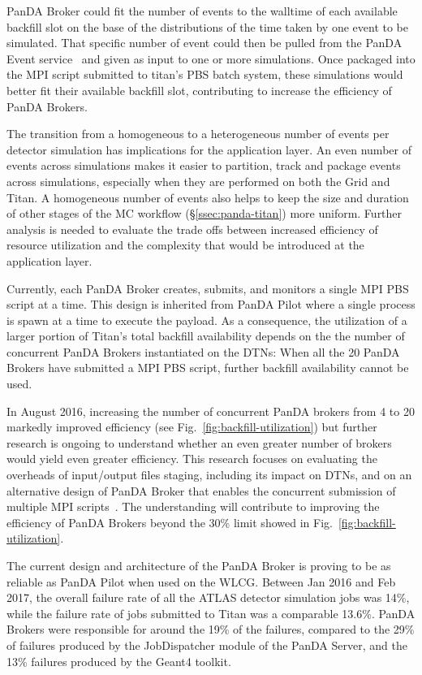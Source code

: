 PanDA Broker could fit the number of events to the walltime of each available
backfill slot on the base of the distributions of the time taken by one event
to be simulated. That specific number of event could then be pulled from the
PanDA Event service~\cite{calafiura2015atlas} and given as input to one or
more simulations. Once packaged into the MPI script submitted to titan's PBS
batch system, these simulations would better fit their available backfill
slot, contributing to increase the efficiency of PanDA Brokers.

The transition from a homogeneous to a heterogeneous number of events per
detector simulation has implications for the application layer. An even
number of events across simulations makes it easier to partition, track and
package events across simulations, especially when they are performed on both
the Grid and Titan. A homogeneous number of events also helps to keep the
size and duration of other stages of the MC workflow
(\S\ref{ssec:panda-titan}) more uniform. Further analysis is needed to
evaluate the trade offs between increased efficiency of resource utilization
and the complexity that would be introduced at the application layer.

Currently, each PanDA Broker creates, submits, and monitors a single MPI PBS
script at a time. This design is inherited from PanDA Pilot where a single
process is spawn at a time to execute the payload. As a consequence, the
utilization of a larger portion of Titan's total backfill availability
depends on the the number of concurrent PanDA Brokers instantiated on the
DTNs: When all the 20 PanDA Brokers have submitted a MPI PBS script, further
backfill availability cannot be used.

In August 2016, increasing the number of concurrent PanDA brokers from 4 to
20 markedly improved efficiency (see Fig.~\ref{fig:backfill-utilization}) but
further research is ongoing to understand whether an even greater number of
brokers would yield even greater efficiency. This research focuses on
evaluating the overheads of input/output files staging, including its impact
on DTNs, and on an alternative design of PanDA Broker that enables the
concurrent submission of multiple MPI scripts~\cite{barreiro2016panda}. The
understanding will contribute to improving the efficiency of PanDA Brokers
beyond the 30\% limit showed in Fig.~\ref{fig:backfill-utilization}.

The current design and architecture of the PanDA Broker is proving to be as
reliable as PanDA Pilot when used on the WLCG\@. Between Jan 2016 and Feb
2017, the overall failure rate of all the ATLAS detector simulation jobs was
14\%, while the failure rate of jobs submitted to Titan was a comparable
13.6\%. PanDA Brokers were responsible for around the 19\% of the failures,
compared to the 29\% of failures produced by the JobDispatcher module of the
PanDA Server, and the 13\% failures produced by the Geant4 toolkit. 

